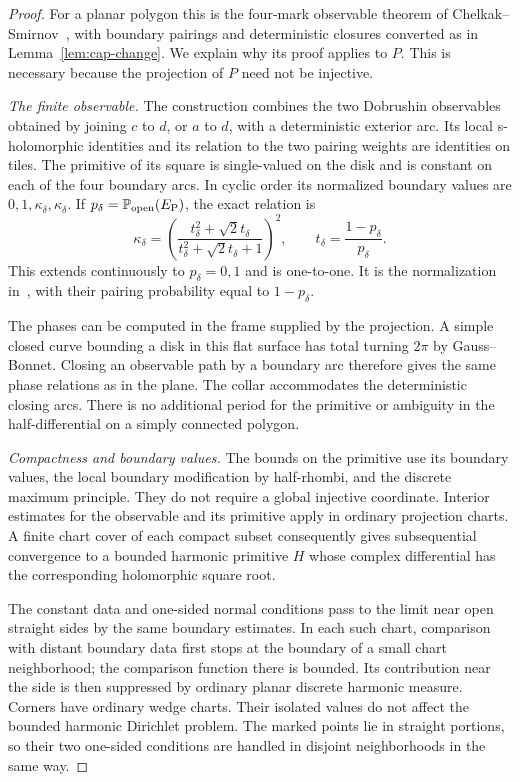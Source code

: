 \begin{proof}
For a planar polygon this is the four-mark observable theorem of
Chelkak--Smirnov~\cite[Theorem~6.1]{CS}, with boundary pairings and
deterministic closures converted as in Lemma~\ref{lem:cap-change}.
We explain why its proof applies to $P$. This is necessary because the
projection of $P$ need not be injective.

\emph{The finite observable.}
The construction combines the two Dobrushin observables obtained by
joining $c$ to $d$, or $a$ to $d$, with a deterministic exterior arc. Its local
s-holomorphic identities and its relation to the two pairing weights
are identities on tiles. The primitive of its square is single-valued
on the disk and is constant on each of the four boundary arcs. In
cyclic order its normalized boundary values are
$0,1,\kappa_\delta,\kappa_\delta$. If
$p_\delta=\P_{\mathrm{open}}(E_{\mathrm P})$, the exact relation is
\begin{equation}\label{eq:primitive-parameter}
 \kappa_\delta=
 \left(\frac{t_\delta^2+\sqrt2t_\delta}
 {t_\delta^2+\sqrt2t_\delta+1}\right)^2,
 \qquad t_\delta=\frac{1-p_\delta}{p_\delta}.
\end{equation}
This extends continuously to $p_\delta=0,1$ and is one-to-one.
It is the normalization in~\cite[Equations~(6.1)--(6.6)]{CS}, with
their pairing probability equal to $1-p_\delta$.

The phases can be computed in the frame supplied by the projection.
A simple closed curve bounding a disk in this flat surface has total
turning $2\pi$ by Gauss--Bonnet. Closing an observable path by a boundary
arc therefore gives the same phase relations as in the plane.
The collar accommodates the deterministic closing arcs. There is no
additional period for the primitive or ambiguity in the half-differential
on a simply connected polygon.

\emph{Compactness and boundary values.}
The bounds on the primitive use its boundary values, the local boundary
modification by half-rhombi, and the discrete maximum principle.
They do not require a global injective coordinate. Interior estimates
for the observable and its primitive apply in ordinary projection
charts. A finite chart cover of each compact subset consequently gives
subsequential convergence to a bounded harmonic primitive $H$ whose
complex differential has the corresponding holomorphic square root.

The constant data and one-sided normal conditions pass to the limit
near open straight sides by the same boundary estimates. In each such
chart, comparison with distant boundary data first stops at the boundary
of a small chart neighborhood; the comparison function there is bounded.
Its contribution near the side is then suppressed by ordinary planar
discrete harmonic measure. Corners have ordinary wedge charts. Their
isolated values do not affect the bounded harmonic Dirichlet problem.
The marked points lie in straight portions, so their two one-sided
conditions are handled in disjoint neighborhoods in the same way.


\end{proof}
